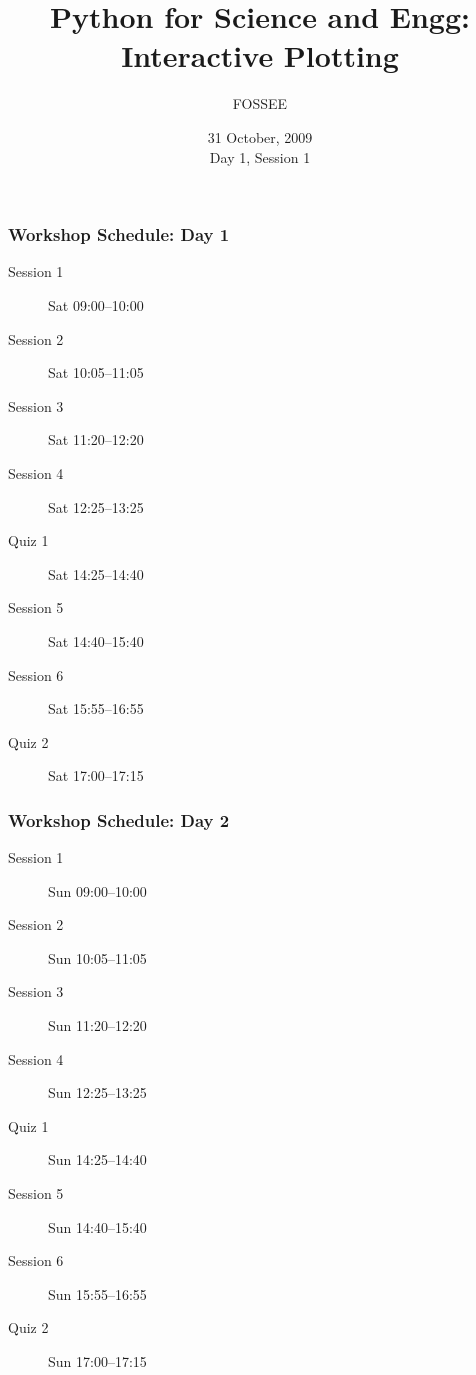 \documentclass[14pt,compress]{beamer}
\title[Interactive Plotting]{Python for Science and Engg: Interactive Plotting}
\author[FOSSEE] {FOSSEE}
\institute[IIT Bombay] {Department of Aerospace Engineering\\IIT Bombay}
\date[] {31 October, 2009\\Day 1, Session 1}
\begin{document}
\begin{frame}
  \maketitle
\end{frame}


\begin{frame}
  \frametitle{Workshop Schedule: Day 1}
  \begin{description}
	\item[Session 1] Sat 09:00--10:00
	\item[Session 2] Sat 10:05--11:05
	\item[Session 3] Sat 11:20--12:20
	\item[Session 4] Sat 12:25--13:25
        \item[Quiz 1] Sat 14:25--14:40
        \item[Session 5] Sat 14:40--15:40
        \item[Session 6] Sat 15:55--16:55
        \item[Quiz 2] Sat 17:00--17:15
  \end{description}
\end{frame}

\begin{frame}
  \frametitle{Workshop Schedule: Day 2}
  \begin{description}
	\item[Session 1] Sun 09:00--10:00
	\item[Session 2] Sun 10:05--11:05
	\item[Session 3] Sun 11:20--12:20
	\item[Session 4] Sun 12:25--13:25
        \item[Quiz 1] Sun 14:25--14:40
        \item[Session 5] Sun 14:40--15:40
        \item[Session 6] Sun 15:55--16:55
        \item[Quiz 2] Sun 17:00--17:15
  \end{description}
\end{frame}
\end{document}
